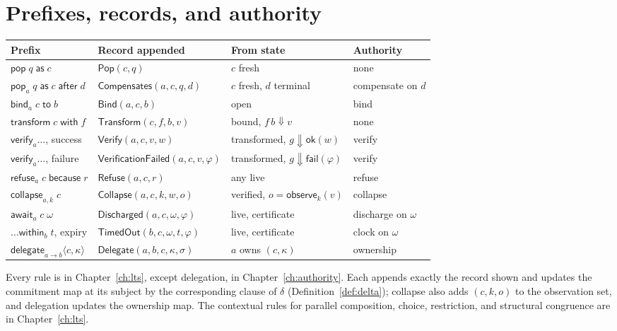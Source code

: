 \documentclass[11pt,openany]{book}
\theoremstyle{remark}
\newcommand{\Pop}{\mathsf{Pop}}
\newcommand{\Refuse}{\mathsf{Refuse}}
\newcommand{\Bind}{\mathsf{Bind}}
\newcommand{\Transform}{\mathsf{Transform}}
\newcommand{\Verify}{\mathsf{Verify}}
\newcommand{\Collapse}{\mathsf{Collapse}}
\newcommand{\Compensates}{\mathsf{Compensates}}
\begin{document}
\section{Prefixes, records, and authority}

\begin{center}
\footnotesize
\setlength{\tabcolsep}{3pt}
\begin{tabular}{L{3.6cm}L{4.0cm}L{3.0cm}L{2.0cm}}
\toprule
Prefix & Record appended & From state & Authority\\
\midrule
$\mathsf{pop}\;q\;\mathsf{as}\;c$ & $\Pop(c,q)$ & $c$ fresh & none\\
$\mathsf{pop}_a\;q\;\mathsf{as}\;c\;\mathsf{after}\;d$ & $\Compensates(a,c,q,d)$ & $c$ fresh, $d$ terminal & compensate on $d$\\
$\mathsf{bind}_a\;c\;\mathsf{to}\;b$ & $\Bind(a,c,b)$ & open & bind\\
$\mathsf{transform}\;c\;\mathsf{with}\;f$ & $\Transform(c,f,b,v)$ & bound, $f\,b\Downarrow v$ & none\\
$\mathsf{verify}_a\ldots$, success & $\Verify(a,c,v,w)$ & transformed, $g\Downarrow\mathsf{ok}(w)$ & verify\\
$\mathsf{verify}_a\ldots$, failure & $\mathsf{VerificationFailed}(a,c,v,\varphi)$ & transformed, $g\Downarrow\mathsf{fail}(\varphi)$ & verify\\
$\mathsf{refuse}_a\;c\;\mathsf{because}\;r$ & $\Refuse(a,c,r)$ & any live & refuse\\
$\mathsf{collapse}_{a,k}\;c$ & $\Collapse(a,c,k,w,o)$ & verified, $o=\mathsf{observe}_k(v)$ & collapse\\
$\mathsf{await}_a\;c\;\omega$ & $\mathsf{Discharged}(a,c,\omega,\varphi)$ & live, certificate & discharge on $\omega$\\
$\ldots\mathsf{within}_b\;t$, expiry & $\mathsf{TimedOut}(b,c,\omega,t,\varphi)$ & live, certificate & clock on $\omega$\\
$\mathsf{delegate}_{a\to b}\langle c,\kappa\rangle$ & $\mathsf{Delegate}(a,b,c,\kappa,\sigma)$ & $a$ owns $(c,\kappa)$ & ownership\\
\bottomrule
\end{tabular}
\end{center}
Every rule is in Chapter~\ref{ch:lts}, except delegation, in
Chapter~\ref{ch:authority}. Each appends exactly the record shown and
updates the commitment map at its subject by the corresponding clause of
$\delta$ (Definition~\ref{def:delta}); collapse also adds $(c,k,o)$ to
the observation set, and delegation updates the ownership map. The
contextual rules for parallel composition, choice, restriction, and
structural congruence are in Chapter~\ref{ch:lts}.
\end{document}
